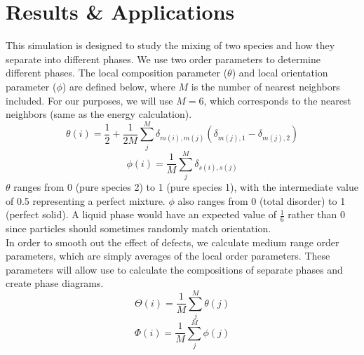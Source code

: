 \documentclass{article}
\begin{document}
\section*{Results \& Applications}
\vspace{-7pt}
\indent\indent This simulation is designed to study the mixing of two species and how they separate into different phases. We use two order parameters to determine different phases. The local composition parameter ($\theta$) and local orientation parameter ($\phi$) are defined below, where $M$ is the number of nearest neighbors included. For our purposes, we will use $M=6$, which corresponds to the nearest neighbors (same as the energy calculation).
$$\theta(i) = \frac{1}{2} + \frac{1}{2M}\sum_j^M\delta_{m(i),m(j)}\left(\delta_{m(j),1}-\delta_{m(j),2}\right)$$
$$\phi(i) = \frac{1}{M}\sum_j^M\delta_{s(i),s(j)}$$
$\theta$ ranges from 0 (pure species 2) to 1 (pure species 1), with the intermediate value of 0.5 representing a perfect mixture. $\phi$ also ranges from 0 (total disorder) to 1 (perfect solid). A liquid phase would have an expected value of $\frac{1}{6}$ rather than 0 since particles should sometimes randomly match orientation.\\
\indent In order to smooth out the effect of defects, we calculate medium range order parameters, which are simply averages of the local order parameters. These parameters will allow use to calculate the compositions of separate phases and create phase diagrams.
$$\Theta(i) = \frac{1}{M}\sum_j^M\theta(j)$$
$$\Phi(i) = \frac{1}{M}\sum_j^M\phi(j)$$


\newpage
\end{document}
